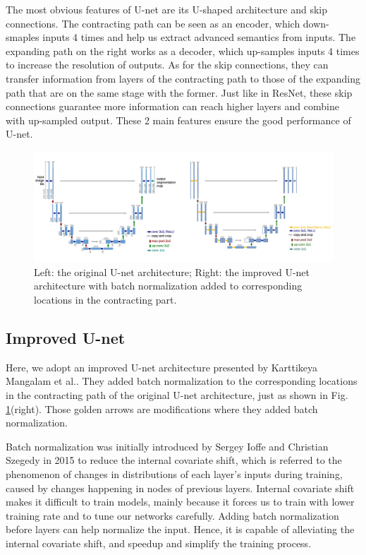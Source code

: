 \documentclass[sigconf]{acmart}
\begin{document}
The most obvious features of U-net are its U-shaped architecture and skip connections. The contracting path can be seen as an encoder, which down-smaples inputs 4 times and help us extract advanced semantics from inputs. The expanding path on the right works as a decoder, which up-samples inputs 4 times to increase the resolution of outputs. As for the skip connections, they can transfer information from layers of the contracting path to those of the expanding path that are on the same stage with the former. Just like in ResNet\cite{resnet}, these skip connections guarantee more information can reach higher layers and combine with up-sampled output. These 2 main features ensure the good performance of U-net.


\begin{figure}
  \centering
  \includegraphics[width=15cm]{fig1.jpg}
    \caption{ Left: the original U-net architecture; Right: the improved U-net architecture with batch normalization added to corresponding locations in the contracting part.}
  \label{fig:fig1}
\end{figure}

\subsection{Improved U-net}
Here, we adopt an improved U-net architecture presented by Karttikeya Mangalam et al.\cite{improved-unet}. They added batch normalization to the corresponding locations in the contracting path of the original U-net architecture, just as shown in Fig. \ref{fig:fig1}(right). Those golden arrows are modifications where they added batch normalization. 

Batch normalization was initially introduced by Sergey Ioffe and Christian Szegedy\cite{batch-normalization} in 2015 to reduce the internal covariate shift, which is referred to the phenomenon of changes in distributions of each layer's inputs during training, caused by changes happening in nodes of previous layers. Internal covariate shift makes it difficult to train models, mainly because it forces us to train with lower training rate and to tune our networks carefully. Adding batch normalization before layers can help normalize the input. Hence, it is capable of alleviating the internal covariate shift, and speedup and simplify the training process. 
\end{document}
